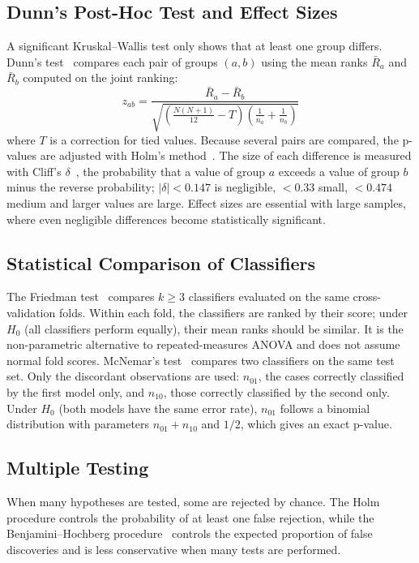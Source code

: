 \subsection{Dunn's Post-Hoc Test and Effect Sizes}
A significant Kruskal--Wallis test only shows that at least one group differs. Dunn's test~\cite{dunn1964multiple} compares each pair of groups $(a, b)$ using the mean ranks $\bar{R}_a$ and $\bar{R}_b$ computed on the joint ranking:
\begin{equation}
  z_{ab} = \frac{\bar{R}_a - \bar{R}_b}{\sqrt{\left(\frac{N(N+1)}{12} - T\right)\left(\frac{1}{n_a} + \frac{1}{n_b}\right)}}
  \label{eq:dunn}
\end{equation}
where $T$ is a correction for tied values. Because several pairs are compared, the p-values are adjusted with Holm's method~\cite{holm1979simple}. The size of each difference is measured with Cliff's $\delta$~\cite{cliff1993dominance}, the probability that a value of group $a$ exceeds a value of group $b$ minus the reverse probability; $|\delta| < 0.147$ is negligible, $< 0.33$ small, $< 0.474$ medium and larger values are large. Effect sizes are essential with large samples, where even negligible differences become statistically significant.

\subsection{Statistical Comparison of Classifiers}
The Friedman test~\cite{friedman1937use} compares $k \geq 3$ classifiers evaluated on the same cross-validation folds. Within each fold, the classifiers are ranked by their score; under $H_0$ (all classifiers perform equally), their mean ranks should be similar. It is the non-parametric alternative to repeated-measures ANOVA and does not assume normal fold scores. McNemar's test~\cite{mcnemar1947note} compares two classifiers on the same test set. Only the discordant observations are used: $n_{01}$, the cases correctly classified by the first model only, and $n_{10}$, those correctly classified by the second only. Under $H_0$ (both models have the same error rate), $n_{01}$ follows a binomial distribution with parameters $n_{01} + n_{10}$ and $1/2$, which gives an exact p-value.

\subsection{Multiple Testing}
When many hypotheses are tested, some are rejected by chance. The Holm procedure controls the probability of at least one false rejection, while the Benjamini--Hochberg procedure~\cite{benjamini1995controlling} controls the expected proportion of false discoveries and is less conservative when many tests are performed.

